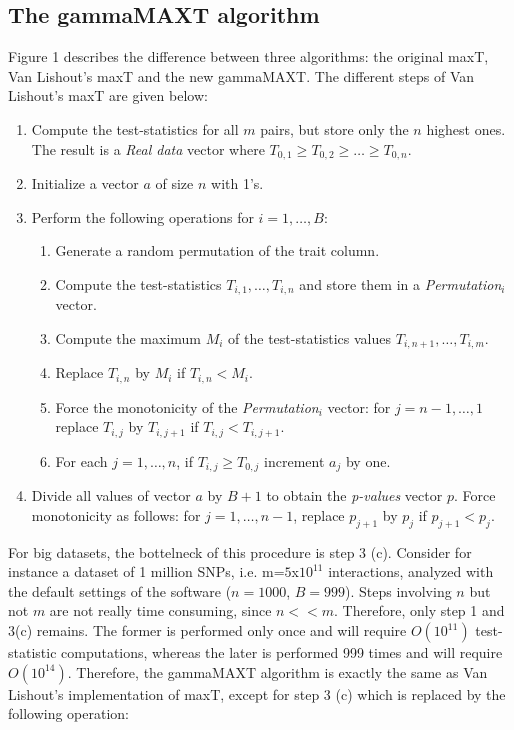 \documentclass{bmcart}
\begin{document}
\subsection*{The gammaMAXT algorithm}

Figure 1 describes the difference between three algorithms: the original maxT, Van Lishout's maxT and the new gammaMAXT. The different steps of Van Lishout's maxT are given below: 

\begin{enumerate}
\item Compute the test-statistics for all $m$ pairs, but store only the $n$ highest ones. The result is a {\em Real data} vector where $T_{0,1} \ge T_{0,2} \ge \ldots \ge T_{0,n}$.
\item Initialize a vector $a$ of size $n$ with 1's.
\item Perform the following operations for $i=1,\ldots,B$: 
\begin{enumerate}
\item Generate a random permutation of the trait column. 
\item Compute the test-statistics $T_{i,1}, \ldots, T_{i,n}$ and store them in a {\em Permutation$_i$} vector.
\item Compute the maximum $M_i$ of the test-statistics values $T_{i,n+1}, \ldots, T_{i,m}$.
\item Replace $T_{i,n}$ by $M_i$ if $T_{i,n} < M_i$.
\item Force the monotonicity of the {\em Permutation$_i$} vector: for $j = n-1,\ldots,1$ replace $T_{i,j}$ by $T_{i,j+1}$ if $T_{i,j} < T_{i,j+1}$. 
\item For each $j = 1, \ldots, n$, if $T_{i,j} \ge T_{0,j}$ increment $a_j$ by one.
\end{enumerate}
\item Divide all values of vector $a$ by $B+1$ to obtain the {\em p-values} vector $p$. Force monotonicity as follows: for $j = 1,\ldots,n-1$, replace $p_{j+1}$ by $p_{j}$ if $p_{j+1} < p_j$.
\end{enumerate}

\medskip

For big datasets, the bottelneck of this procedure is step 3 (c). Consider for instance a dataset of 1 million SNPs, i.e. m=$5$x$10^{11}$ interactions, analyzed with the default settings of the software ($n=1000$, $B=999$). Steps involving $n$ but not $m$ are not really time consuming, since $n << m$. Therefore, only step 1 and 3(c) remains. The former is performed only once and will require $O(10^{11})$ test-statistic computations, whereas the later is performed 999 times and will require $O(10^{14})$. Therefore, the gammaMAXT algorithm is exactly the same as Van Lishout's implementation of maxT, except for step 3 (c) which is replaced by the following operation:
\end{document}
